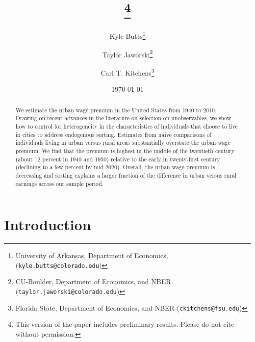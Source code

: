 \documentclass[12pt]{article}
\makeatletter
\def\emailkyle{\tt{\color{blue}kyle.butts@colorado.edu}}
\def\emailtaylor{\tt{\color{blue}taylor.jaworski@colorado.edu}}
\def\emailcarl{\tt{\color{blue}ckitchens@fsu.edu}}
\makeatother
\begin{document}
  
\begin{titlepage}

\title{\thanks{This version of the paper includes preliminary results. Please do not cite without permission.}}
\author{%
  \large Kyle Butts\thanks{University of Arkansas, Department of Economics, ({\emailkyle})}
  \and
  \large Taylor Jaworski\thanks{CU-Boulder, Department of Economics, and NBER ({\emailtaylor})}  
  \and
  \large Carl T.
  Kitchens\thanks{Florida State, Department of Economics, and NBER ({\emailcarl})}  
}
\date{\large \today}

\maketitle

\begin{singlespacing}
\begin{abstract}\noindent
We estimate the urban wage premium in the United States from 1940 to 2010.
Drawing on recent advances in the literature on selection on unobservables, we show how to control for heterogeneity in the characteristics of individuals that choose to live in cities to address endogenous sorting.
Estimates from naive comparisons of individuals living in urban versus rural areas substantially overstate the urban wage premium.
We find that the premium is highest in the middle of the twentieth century (about 12 percent in 1940 and 1950) relative to the early in twenty-first century (declining to a few percent by mid-2020).
Overall, the urban wage premium is decreasing and sorting explains a larger fraction of the difference in urban versus rural earnings across our sample period.
\end{abstract}
\end{singlespacing}

\thispagestyle{empty}

\end{titlepage}


\section{Introduction}
\end{document}
